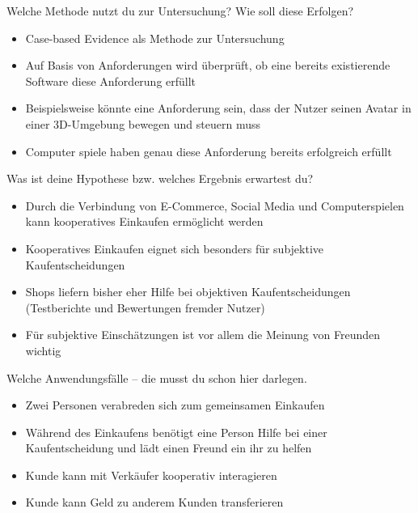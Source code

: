 Welche Methode nutzt du zur Untersuchung? Wie soll diese Erfolgen?

\begin{itemize}
\item Case-based Evidence als Methode zur Untersuchung 
\item Auf Basis von Anforderungen wird überprüft, ob eine bereits existierende Software diese Anforderung erfüllt 
\item Beispielsweise könnte eine Anforderung sein, dass der Nutzer seinen Avatar in einer 3D-Umgebung bewegen und steuern muss 
\item Computer spiele haben genau diese Anforderung bereits erfolgreich erfüllt 
\end{itemize}

Was ist deine Hypothese bzw. welches Ergebnis erwartest du?

\begin{itemize}
\item Durch die Verbindung von E-Commerce, Social Media und Computerspielen kann kooperatives Einkaufen ermöglicht werden 
\item Kooperatives Einkaufen eignet sich besonders für subjektive Kaufentscheidungen 
\item Shops liefern bisher eher Hilfe bei objektiven Kaufentscheidungen (Testberichte und Bewertungen fremder Nutzer) 
\item Für subjektive Einschätzungen ist vor allem die Meinung von Freunden wichtig 
\end{itemize}

Welche Anwendungsfälle – die musst du schon hier darlegen.

\begin{itemize}
\item Zwei Personen verabreden sich zum gemeinsamen Einkaufen 
\item Während des Einkaufens benötigt eine Person Hilfe bei einer Kaufentscheidung und lädt einen Freund ein ihr zu helfen 
\item Kunde kann mit Verkäufer kooperativ interagieren 
\item Kunde kann Geld zu anderem Kunden transferieren
\end{itemize}
